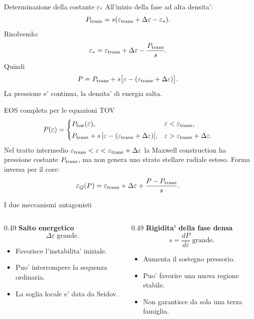 \begin{frame}{Determinazione della costante $\varepsilon_*$}
\small
All'inizio della fase ad alta densita':
\[
P_{\rm trans}=s(\varepsilon_{\rm trans}
+\Delta\varepsilon-\varepsilon_*).
\]
Risolvendo:
\[
{
\varepsilon_*=
\varepsilon_{\rm trans}+\Delta\varepsilon-
\frac{P_{\rm trans}}s.}
\]
Quindi
\[
P=P_{\rm trans}+s\big[\varepsilon-
(\varepsilon_{\rm trans}+\Delta\varepsilon)\big].
\]
La pressione e' continua, la densita' di energia salta.
\end{frame}

\begin{frame}{EOS completa per le equazioni TOV}
\footnotesize
\[
P(\varepsilon)=
\begin{cases}
P_{\rm low}(\varepsilon),
& \varepsilon<\varepsilon_{\rm trans},\\[1mm]
P_{\rm trans}
+s\,[\varepsilon-(\varepsilon_{\rm trans}+\Delta\varepsilon)],
& \varepsilon>\varepsilon_{\rm trans}+\Delta\varepsilon.
\end{cases}
\]
Nel tratto intermedio $\varepsilon_{\rm trans}<\varepsilon<
\varepsilon_{\rm trans}+\Delta\varepsilon$ la Maxwell
construction ha pressione costante $P_{\rm trans}$,
ma non genera uno strato stellare radiale esteso.
\medskip
Forma inversa per il core:
\[
{\varepsilon_Q(P)=\varepsilon_{\rm trans}
+\Delta\varepsilon+\frac{P-P_{\rm trans}}s.}
\]
\end{frame}

\begin{frame}{I due meccanismi antagonisti}
\small
\begin{columns}[T,onlytextwidth]
\begin{column}{0.49\textwidth}
\textbf{Salto energetico}
\[
\Delta\varepsilon\;\text{grande}.
\]
\begin{itemize}
\item Favorisce l'instabilita' iniziale.
\item Puo' interrompere la sequenza ordinaria.
\item La soglia locale e' data da Seidov.
\end{itemize}
\end{column}
\begin{column}{0.49\textwidth}
\textbf{Rigidita' della fase densa}
\[
s=\frac{dP}{d\varepsilon}\;\text{grande}.
\]
\begin{itemize}
\item Aumenta il sostegno pressorio.
\item Puo' favorire una nuova regione stabile.
\item Non garantisce da sola una terza famiglia.
\end{itemize}
\end{column}
\end{columns}
\end{frame}

